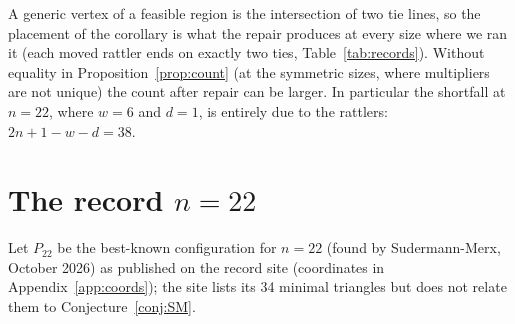 \documentclass[11pt]{amsart}
\theoremstyle{definition}
\begin{document}
A generic vertex of a feasible region is the intersection of two tie lines, so the placement of the corollary is what the repair produces at every size where we ran it (each moved rattler ends on exactly two ties, Table~\ref{tab:records}). Without equality in Proposition~\ref{prop:count} (at the symmetric sizes, where multipliers are not unique) the count after repair can be larger. In particular the shortfall at $n = 22$, where $w = 6$ and $d = 1$, is entirely due to the rattlers: $2n + 1 - w - d = 38$.

\section{The record \texorpdfstring{$n = 22$}{n = 22}}\label{sec:22}

Let $P_{22}$ be the best-known configuration for $n = 22$ (found by Sudermann-Merx, October 2026) as published on the record site \cite{Stead} (coordinates in Appendix~\ref{app:coords}); the site lists its 34 minimal triangles but does not relate them to Conjecture~\ref{conj:SM}.
\end{document}
